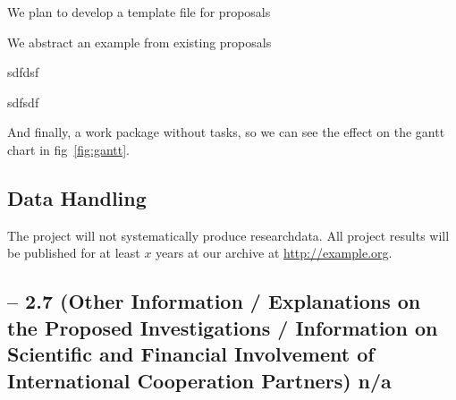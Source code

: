\begin{workplan}
\begin{workarea}[id=systems,title={System Development}]
\begin{workpackage}[id=temple,lead=pcg,
  title= Proposal Template,short=Template,jacuRM=12]

We plan to develop a template file for {\pn} proposals

We abstract an example from existing proposals
\begin{tasklist}
  \begin{task}[wphases=6-12]
    sdfdsf 
  \end{task}
  \begin{task}[id=temple2,wphases=18-24,requires=\taskin{t3}{class}]
    sdfsdf
  \end{task} 
\end{tasklist}
\end{workpackage}

\begin{workpackage}[id=workphase,title=A work package without tasks,
  wphases=0-4!.5]
  
  And finally, a work package without tasks, so we can see the effect on the gantt chart
  in fig~\ref{fig:gantt}.
\end{workpackage}
\end{workarea}
\end{workplan} 

\ganttchart[draft,xscale=.45] 

\subsection{Data Handling}\label{sec:data}

The \pn project will not systematically produce researchdata. All project results will be
published for at least $x$ years at our archive at \url{http://example.org}.

\subsection{-- 2.7 (Other Information / Explanations on the Proposed Investigations / Information on Scientific and Financial Involvement of International
  Cooperation Partners) \qquad \sf n/a}



